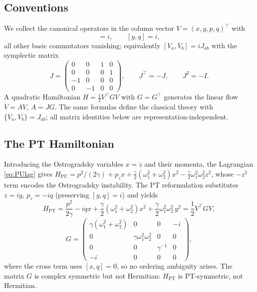 \documentclass[11pt]{article}
\theoremstyle{definition}
\theoremstyle{remark}
\newcommand{\w}{\omega}
\begin{document}
\subsection{Conventions}

We collect the canonical operators in the column vector $V=(x,y,p,q)^{\top}$
with
\begin{equation}
[x,p]=i,\qquad [y,q]=i,
\end{equation}
all other basic commutators vanishing; equivalently $[V_a,V_b]=iJ_{ab}$ with
the symplectic matrix
\begin{equation}
J=\begin{pmatrix}0&0&1&0\\0&0&0&1\\-1&0&0&0\\0&-1&0&0\end{pmatrix},
\qquad J^{\top}=-J,\qquad J^2=-I .
\end{equation}
A quadratic Hamiltonian $H=\tfrac12V^{\top}GV$ with $G=G^{\top}$ generates the
linear flow $\dot V=AV$, $A=JG$.  The same formulas define the classical
theory with $\{V_a,V_b\}=J_{ab}$; all matrix identities below are
representation-independent.

\subsection{The PT Hamiltonian}

Introducing the Ostrogradsky variables $x=\dot z$ and their momenta, the
Lagrangian \eqref{eq:PUlag} gives
$H_{\mathrm{PU}}=p^2/(2\gamma)+p_z x
+\tfrac{\gamma}{2}(\w_1^2+\w_2^2)x^2-\tfrac{\gamma}{2}\w_1^2\w_2^2 z^2$,
whose $-z^2$ term encodes the Ostrogradsky instability.  The PT reformulation
\cite{BM2008PRL,BM2008PRD} substitutes $z=iy$, $p_z=-iq$ (preserving
$[y,q]=i$) and yields
\begin{equation}\label{eq:HPT}
H_{\mathrm{PT}}
=\frac{p^2}{2\gamma}-iqx
+\frac{\gamma}{2}(\w_1^2+\w_2^2)x^2
+\frac{\gamma}{2}\w_1^2\w_2^2\,y^2
=\frac12 V^{\top}GV,
\end{equation}
\begin{equation}\label{eq:G}
G=\begin{pmatrix}
\gamma(\w_1^2+\w_2^2)&0&0&-i\\
0&\gamma\w_1^2\w_2^2&0&0\\
0&0&\gamma^{-1}&0\\
-i&0&0&0
\end{pmatrix},
\end{equation}
where the cross term uses $[x,q]=0$, so no ordering ambiguity arises.  The
matrix $G$ is complex symmetric but not Hermitian: $H_{\mathrm{PT}}$ is
PT-symmetric, not Hermitian.
\end{document}
